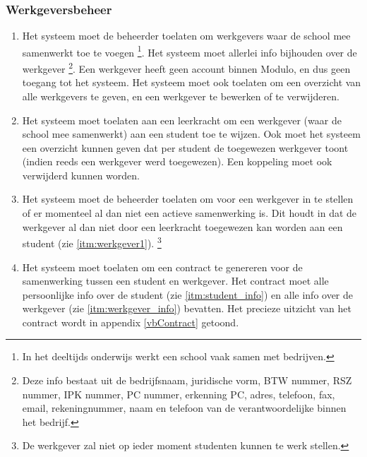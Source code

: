 \documentclass[a4paper]{article}
\begin{document}
\subsubsection{Werkgeversbeheer}
\begin{enumerate}[label=F\arabic*,resume]
\item \label{itm:werkgever_info} Het systeem moet de beheerder toelaten om werkgevers waar de school mee samenwerkt toe te voegen \footnote{In het deeltijds onderwijs werkt een school vaak samen met bedrijven.}. Het systeem moet allerlei info bijhouden over de werkgever \footnote{Deze info bestaat uit de bedrijfsnaam, juridische vorm, BTW nummer, RSZ nummer, IPK nummer, PC nummer, erkenning PC, adres, telefoon, fax, email, rekeningnummer, naam en telefoon van de verantwoordelijke binnen het bedrijf.}. Een werkgever heeft geen account binnen Modulo, en dus geen toegang tot het systeem. Het systeem moet ook toelaten om een overzicht van alle werkgevers te geven, en een werkgever te bewerken of te verwijderen.
\item \label{itm:werkgever1} Het systeem moet toelaten aan een leerkracht om een werkgever (waar de school mee samenwerkt) aan een student toe te wijzen. Ook moet het systeem een overzicht kunnen geven dat per student de toegewezen werkgever toont (indien reeds een werkgever werd toegewezen). Een koppeling moet ook verwijderd kunnen worden.
\item Het systeem moet de beheerder toelaten om voor een werkgever in te stellen of er momenteel al dan niet een actieve samenwerking is. Dit houdt in dat de werkgever al dan niet door een leerkracht toegewezen kan worden aan een student (zie \ref{itm:werkgever1}). \footnote{De werkgever zal niet op ieder moment studenten kunnen te werk stellen.}
\item \label{itm:werkgever2} Het systeem moet toelaten om een contract te genereren voor de samenwerking tussen een student en werkgever. Het contract moet alle persoonlijke info over de student (zie \ref{itm:student_info}) en alle info over de werkgever (zie \ref{itm:werkgever_info}) bevatten. Het precieze uitzicht van het contract wordt in appendix \ref{vbContract} getoond.
\end{enumerate}
\end{document}
